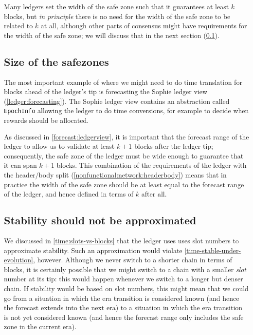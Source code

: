 Many ledgers set the width of the safe zone such that it guarantees at least $k$
blocks, but \emph{in principle} there is no need for the width of the safe zone
to be related to $k$ at all, although other parts of consensus might have
requirements for the width of the safe zone; we will discuss that in the next
section (\cref{time:ledgerrestrictions:safezones}).

\subsection{Size of the safezones}
\label{time:ledgerrestrictions:safezones}

The most important example of where we might need to do time translation for
blocks ahead of the ledger's tip is forecasting the Sophie ledger view
(\cref{ledger:forecasting}). The Sophie ledger view contains an abstraction
called \lstinline!EpochInfo! allowing the ledger to do time conversions, for
example to decide when rewards should be allocated.

As discussed in \cref{forecast:ledgerview}, it is important that the forecast
range of the ledger to allow us to validate at least $k + 1$ blocks after the
ledger tip; consequently, the safe zone of the ledger must be wide enough to
guarantee that it can span $k + 1$ blocks. This combination of the requirements
of the ledger with the header/body split
(\cref{nonfunctional:network:headerbody}) means that in practice the width of
the safe zone should be at least equal to the forecast range of the ledger, and
hence defined in terms of $k$ after all.

\subsection{Stability should not be approximated}

We discussed in \cref{time:slots-vs-blocks} that the ledger uses uses slot
numbers to approximate stability. Such an approximation would violate
\cref{time-stable-under-evolution}, however. Although we never switch to a
shorter chain in terms of blocks, it is certainly possible that we might switch
to a chain with a smaller \emph{slot} number at its tip: this would happen
whenever we switch to a longer but denser chain. If stability would be based on
slot numbers, this might mean that we could go from a situation in which the era
transition is considered known (and hence the forecast extends into the next
era) to a situation in which the era transition is not yet considered known (and
hence the forecast range only includes the safe zone in the current era).

